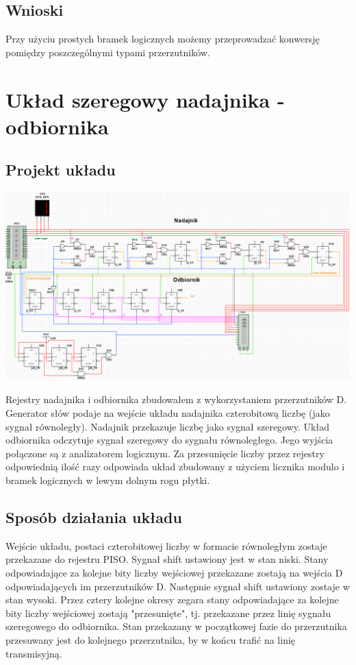 \documentclass{article}
\begin{document}
            
        \subsection{Wnioski}
            Przy użyciu prostych bramek logicznych możemy przeprowadzać konwersję pomiędzy poszczególnymi typami przerzutników.
    
    \section{Układ szeregowy nadajnika - odbiornika}
        \subsection{Projekt układu}
            \begin{center}
                \includegraphics[width=18cm]{reports/img/Z2C_1.png}\\
            \end{center}
            Rejestry nadajnika i odbiornika zbudowałem z wykorzystaniem przerzutników D. Generator słów podaje na wejście układu nadajnika czterobitową liczbę (jako sygnał równoległy). Nadajnik przekazuje liczbę jako sygnał szeregowy. Układ odbiornika odczytuje sygnał szeregowy do sygnału równoległego. Jego wyjścia połączone są z analizatorem logicznym. Za przesunięcie liczby przez rejestry odpowiednią ilość razy odpowiada układ zbudowany z użyciem licznika modulo i bramek logicznych w lewym dolnym rogu płytki. 
            
        \subsection{Sposób działania układu}
            Wejście układu, postaci czterobitowej liczby w formacie równoległym zostaje przekazane do rejestru PISO. Sygnał shift ustawiony jest w stan niski. Stany odpowiadające za kolejne bity liczby wejściowej przekazane zostają na wejścia D odpowiadających im przerzutników D. Następnie sygnał shift ustawiony zostaje w stan wysoki. Przez cztery kolejne okresy zegara stany odpowiadające za kolejne bity liczby wejściowej zostają "przesunięte", tj. przekazane przez linię sygnału szeregowego do odbiornika. Stan przekazany w początkowej fazie do przerzutnika przesuwany jest do kolejnego przerzutnika, by w końcu trafić na linię transmisyjną. 
            
\end{document}
